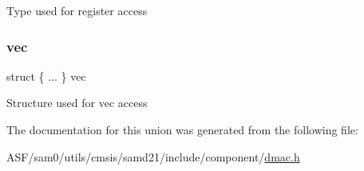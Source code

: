 Type used for register access \mbox{\label{union_d_m_a_c___p_e_n_d_c_h___type_a7cb87177144b4bccfc63be701cd19127}} 
\subsubsection{\texorpdfstring{vec}{vec}}
{\footnotesize\ttfamily struct \{ ... \}   vec}

Structure used for vec access 

The documentation for this union was generated from the following file\+:\begin{DoxyCompactItemize}
\item 
A\+S\+F/sam0/utils/cmsis/samd21/include/component/\mbox{\hyperlink{component_2dmac_8h}{dmac.\+h}}\end{DoxyCompactItemize}
